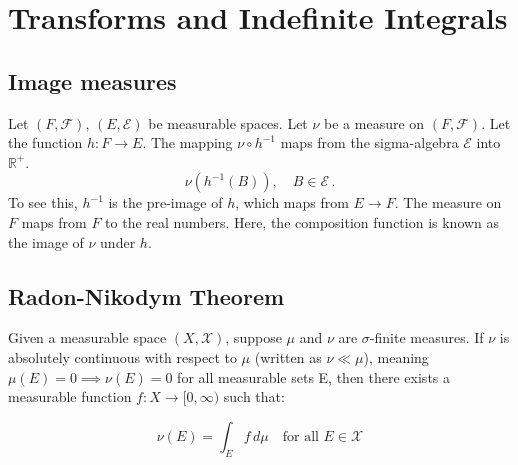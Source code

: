 \section{Transforms and Indefinite Integrals}

\subsection{Image measures}

Let $(F, \mathcal{F})$, $(E, \mathcal{E})$ be measurable spaces. Let $\nu$ be a measure on $(F, 
\mathcal{F})$. Let the function $h:F \rightarrow E$. The mapping $\nu \circ h^{-1}$ maps from the sigma-algebra $\mathcal{E}$ into $\mathbb{R}^+$. 
\begin{equation}
	\nu(h^{-1}(B)), \quad B \in \mathcal{E}\,.
\end{equation}
To see this, $h^{-1}$ is the pre-image of $h$, which maps from $E\rightarrow F$. The measure on $F$ maps from $F$ to the real numbers. Here, the composition function is known as the image of $\nu$ under $h$. 

\subsection{Radon-Nikodym Theorem}
Given a measurable space \((X, \mathcal{X})\), suppose $\mu$ and $\nu$ are $\sigma$-finite measures. If $\nu$ is absolutely continuous with respect to $\mu$ (written as \(\nu \ll \mu\)), meaning \(\mu(E) = 0 \implies \nu(E) = 0\) for all measurable sets E, then there exists a measurable function \(f: X \to [0, \infty)\) such that:

\begin{equation}
	\nu (E)=\int _{E}f\,d\mu \quad \text{for\ all\ }E\in \mathcal{X}
\end{equation}

